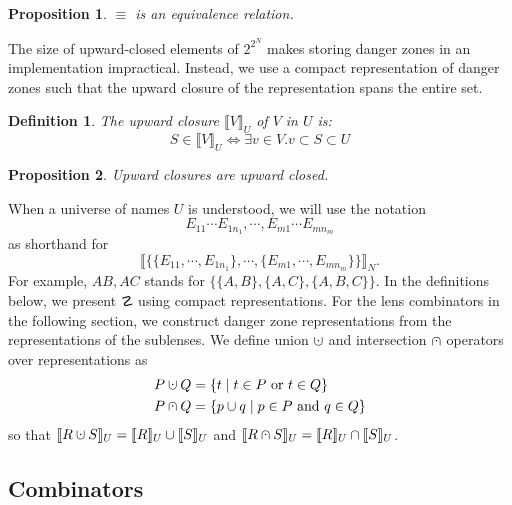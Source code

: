\documentclass{article}
\newcommand{\cupdot}{\mathbin{\mathaccent\cdot\cup}}
\newcommand{\capdot}{\mathbin{\mathaccent\cdot\cap}}
\newtheorem{definition}{Definition}
\newtheorem{proposition}{Proposition}
\begin{document}
\begin{proposition}
    $\equiv$ is an equivalence relation.
\end{proposition}

The size of upward-closed elements of $2^{2^N}$ makes storing danger zones
in an implementation impractical. Instead, we use a compact representation
of danger zones such that the upward closure of the representation
spans the entire set.

\newcommand{\upclose}[2]{\llbracket #1 \rrbracket_{#2}}
\begin{definition}
    The \emph{upward closure} $\upclose VU$ of $V$ in $U$ is:
    \[S \in \upclose VU \iff \exists v \in V. v \subset S \subset U\]
\end{definition}

\begin{proposition}
    Upward closures are upward closed.
\end{proposition}


When a universe of names $U$ is understood, we will use the notation
\[E_{11}\cdots E_{1n_1},\cdots,E_{m1}\cdots E_{mn_m}\] 
as shorthand for
\[\upclose{\{\{E_{11},\cdots,E_{1n_1}\},\cdots,\{E_{m1},\cdots,E_{mn_m}\}\}}N.\]
For example, $AB,AC$ stands for $\{\{A,B\},\{A,C\},\{A,B,C\}\}$. In the definitions
below, we present $\danger$ using compact representations. For the lens
combinators in the following section, we construct danger zone 
representations from the representations of the sublenses. We define
union $\cupdot$ and intersection $\capdot$ operators over representations as 
\begin{align*}
    P \cupdot Q &= \{ t \mid t \in P \text{ or } t \in Q \} \\
    P \capdot Q &= \{ p \cup q \mid p \in P \text{ and } q \in Q \}
\end{align*}
so that $\upclose{R \cupdot S} U = \upclose{R} U \cup \upclose{S} U$ and
$\upclose{R \capdot S} U = \upclose{R} U \cap \upclose{S} U$.
 
\subsection{Combinators}

\newcommand{\cond}[1]{\left\{\begin{array}{ll}#1\end{array}\right.}
\end{document}
